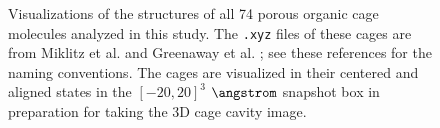 \begin{figure}
\ContinuedFloat \centering
{}
\caption{Visualizations of the structures of all 74 porous organic cage molecules analyzed in this study.
    The \texttt{.xyz} files of these cages are from Miklitz et al. and Greenaway et al. \cite{miklitz2017computational,greenaway2018high};
    see these references for the naming conventions. The cages are visualized in their centered and aligned states
    in the $[-20,20]^3$ $\angstrom$
    snapshot box in preparation for taking the 3D cage cavity image.}
\label{fig:allcagesdetailed}
\end{figure}
